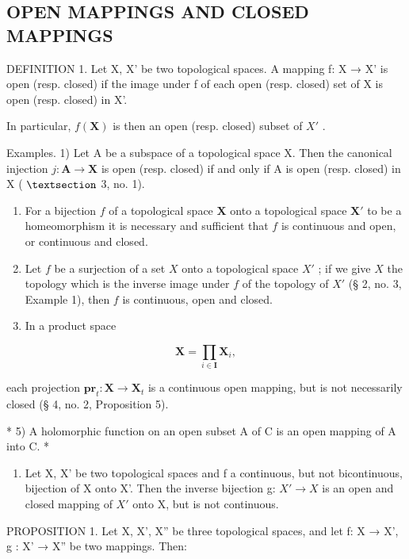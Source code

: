 \subsection{OPEN MAPPINGS AND CLOSED MAPPINGS}

DEFINITION 1. Let X, X' be two topological spaces. A mapping f: X → X' is open (resp. closed) if the image under f of each open (resp. closed) set of X is open (resp. closed) in X'.

In particular, \(f(\mathbf{X})\) is then an open (resp. closed) subset of \(X'\) .

Examples. 1) Let A be a subspace of a topological space X. Then the canonical injection \(j: \mathbf{A} \to \mathbf{X}\) is open (resp. closed) if and only if A is open (resp. closed) in X ( \(\S\) 3, no. 1).

\begin{enumerate}
\def\labelenumi{\arabic{enumi})}
\setcounter{enumi}{1}
\item
  For a bijection \(f\) of a topological space \(\mathbf{X}\) onto a topological space \(\mathbf{X}'\) to be a homeomorphism it is necessary and sufficient that \(f\) is continuous and open, or continuous and closed.
\item
  Let \(f\) be a surjection of a set \(X\) onto a topological space \(X'\) ; if we give \(X\) the topology which is the inverse image under \(f\) of the topology of \(X'\) (§ 2, no. 3, Example 1), then \(f\) is continuous, open and closed.
\item
  In a product space
\end{enumerate}

\[
\mathbf {X} = \prod_ {i \in \mathbf {I}} \mathbf {X} _ {i},
\]

each projection \(\mathbf{pr}_{t}:\mathbf{X}\to\mathbf{X}_{t}\) is a continuous open mapping, but is not necessarily closed (§ 4, no. 2, Proposition 5).

* 5) A holomorphic function on an open subset A of C is an open mapping of A into C. *

\begin{enumerate}
\def\labelenumi{\arabic{enumi})}
\setcounter{enumi}{5}
\tightlist
\item
  Let X, X' be two topological spaces and f a continuous, but not bicontinuous, bijection of X onto X'. Then the inverse bijection g: \(X' \rightarrow X\) is an open and closed mapping of \(X'\) onto X, but is not continuous.
\end{enumerate}

PROPOSITION 1. Let X, X', X'' be three topological spaces, and let f: X → X', g : X' → X'' be two mappings. Then:

